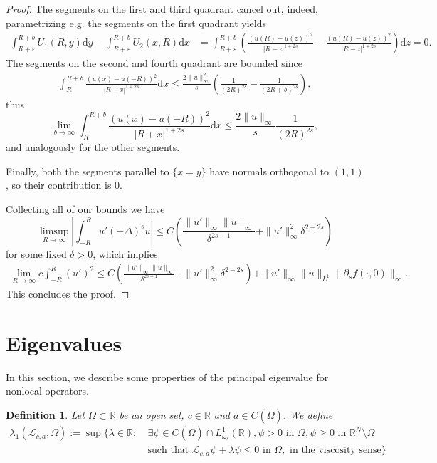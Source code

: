 \documentclass[11pt,a4paper]{amsart}
\newcommand{\Lop}{\mathcal{L}}
\newcommand{\R}{\mathbb{R}}
\newcommand{\Lomega}{L^1_{\omega_s}(\R)}
\newcommand{\dx}{\mathrm{d}x}
\newcommand{\dy}{\mathrm{d}y}
\newcommand{\dz}{\mathrm{d}z}
\renewcommand{\epsilon}{\varepsilon}
\newtheorem{defn}{Definition}
\begin{document}
\begin{proof}
The segments on the first and third quadrant cancel out, indeed, parametrizing e.g. the segments on the first quadrant yields
\begin{align*}
\int_{R+\epsilon}^{R+b} U_1(R, y) \dy - \int_{R+\epsilon}^{R+b} U_2(x, R) \dx &= \int_{R+\epsilon}^{R+b} \left( \frac{(u(R)- u(z))^2}{|R-z|^{1+2s}} - \frac{(u(R)- u(z))^2}{|R-z|^{1+2s}}\right)\dz = 0.
\end{align*}
The segments on the second and fourth quadrant are bounded since
\begin{align*}
\int_R^{R+b}\frac{(u(x) - u(-R))^2}{|R+x|^{1+2s}}\dx\leq \frac{2 \|u\|_{\infty}^2}{s} \left(\frac{1}{(2R)^{2s}} - \frac{1}{(2R + b)^{2s}}\right),
\end{align*}
thus
\[\lim_{b\rightarrow \infty} \int_R^{R+b}\frac{(u(x) - u(-R))^2}{|R+x|^{1+2s}}\dx \leq  \frac{2\|u\|_{\infty}}{s} \frac{1}{(2R)^{2s}},\]
and analogously for the other segments.

Finally, both the segments parallel to $\{x=y\}$ have normals orthogonal to $(1,1)$, so their contribution is 0.

Collecting all of our bounds we have
\[\limsup_{R\rightarrow \infty} \left|\int_{-R}^R u'(-\Delta)^s u\right| \leq  C\left(\frac{\|u'\|_{\infty} \|u\|_{\infty}}{\delta^{2s-1}} + \|u'\|_{\infty}^2 \delta^{2-2s}\right)\]
for some fixed $\delta > 0$, which implies
\begin{align*}
\lim_{R\rightarrow \infty}c\int_{-R}^R (u')^2 \leq  C\left(\frac{\|u'\|_{\infty} \|u\|_{\infty}}{\delta^{2s-1}} + \|u'\|_{\infty}^2 \delta^{2-2s}\right) + \|u'\|_{\infty} \|u\|_{L^1} \|\partial_s f(\cdot, 0)\|_{\infty}.
\end{align*}
This concludes the proof.
\end{proof}

\section{Eigenvalues}
\label{sect:eig}

In this section, we describe some properties of the principal eigenvalue for nonlocal operators. 
\begin{defn} 
Let $\Omega \subset \R$ be an open set, $c\in \R$ and $a \in C(\overline{\Omega})$. We define
\begin{align*}
\lambda_1(\Lop_{c,a}, \Omega):= \sup\{
\lambda \in \R:~ &\exists \psi \in C(\overline{\Omega}) \cap \Lomega, \psi >0 \text{ in } \Omega, \psi \geq 0 \text{ in } \R^N \setminus \Omega \\
& \text{such that } \Lop_{c,a} \psi + \lambda \psi \leq 0 \text{ in }\Omega, \text{ in the viscosity sense}\}
\end{align*}
\end{defn}
\end{document}
